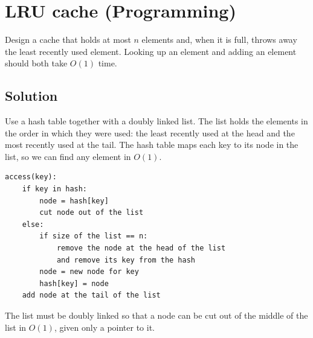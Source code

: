 \section {LRU cache (Programming)}

Design a cache that holds at most $n$ elements and, when it is full, throws away the least recently used element.
Looking up an element and adding an element should both take $O(1)$ time.

\subsection{Solution}

Use a hash table together with a doubly linked list.
The list holds the elements in the order in which they were used: the least recently used at the head and the most recently used at the tail.
The hash table maps each key to its node in the list, so we can find any element in $O(1)$.

\begin{verbatim}
access(key):
    if key in hash:
        node = hash[key]
        cut node out of the list
    else:
        if size of the list == n:
            remove the node at the head of the list
            and remove its key from the hash
        node = new node for key
        hash[key] = node
    add node at the tail of the list
\end{verbatim}

The list must be doubly linked so that a node can be cut out of the middle of the list in $O(1)$, given only a pointer to it.
